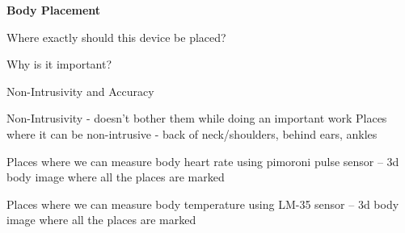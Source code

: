 \newpage
\textbf{Body Placement}

Where exactly should this device be placed?

Why is it important?

Non-Intrusivity and Accuracy

Non-Intrusivity - doesn't bother them while doing an important work
Places where it can be non-intrusive - back of neck/shoulders, behind ears, ankles

Places where we can measure body heart rate using pimoroni pulse sensor
-- 3d body image where all the places are marked

Places where we can measure body temperature using LM-35 sensor
--  3d body image where all the places are marked


